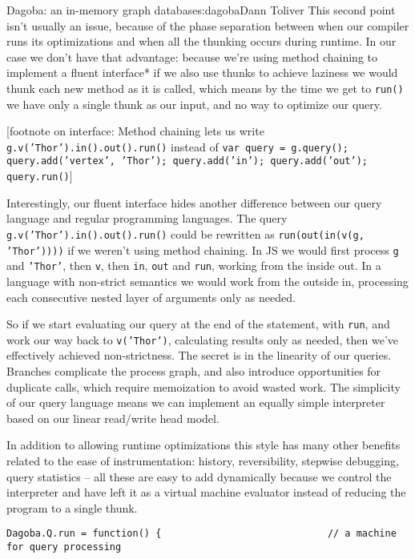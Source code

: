 \begin{aosachapter}{Dagoba: an in-memory graph database}{s:dagoba}{Dann Toliver}
This second point isn't usually an issue, because of the phase
separation between when our compiler runs its optimizations and when all
the thunking occurs during runtime. In our case we don't have that
advantage: because we're using method chaining to implement a fluent
interface* if we also use thunks to achieve laziness we would thunk each
new method as it is called, which means by the time we get to
\texttt{run()} we have only a single thunk as our input, and no way to
optimize our query.

{[}footnote on interface: Method chaining lets us write
\texttt{g.v('Thor').in().out().run()} instead of
\texttt{var query = g.query(); query.add('vertex', 'Thor'); query.add('in'); query.add('out'); query.run()}{]}

Interestingly, our fluent interface hides another difference between our
query language and regular programming languages. The query
\texttt{g.v('Thor').in().out().run()} could be rewritten as
\texttt{run(out(in(v(g, 'Thor'))))} if we weren't using method chaining.
In JS we would first process \texttt{g} and \texttt{'Thor'}, then
\texttt{v}, then \texttt{in}, \texttt{out} and \texttt{run}, working
from the inside out. In a language with non-strict semantics we would
work from the outside in, processing each consecutive nested layer of
arguments only as needed.

So if we start evaluating our query at the end of the statement, with
\texttt{run}, and work our way back to \texttt{v('Thor')}, calculating
results only as needed, then we've effectively achieved non-strictness.
The secret is in the linearity of our queries. Branches complicate the
process graph, and also introduce opportunities for duplicate calls,
which require memoization to avoid wasted work. The simplicity of our
query language means we can implement an equally simple interpreter
based on our linear read/write head model.

In addition to allowing runtime optimizations this style has many other
benefits related to the ease of instrumentation: history, reversibility,
stepwise debugging, query statistics -- all these are easy to add
dynamically because we control the interpreter and have left it as a
virtual machine evaluator instead of reducing the program to a single
thunk.

\label{interpreter-unveiled}

\begin{verbatim}
Dagoba.Q.run = function() {                             // a machine for query processing


\end{verbatim}
\end{aosachapter}
